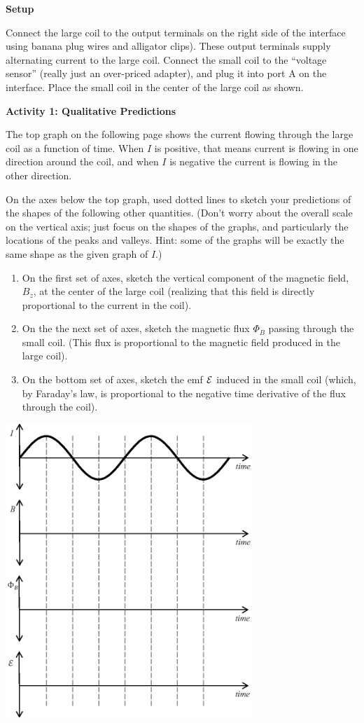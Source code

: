 \textbf{Setup}

Connect the large coil to the output
terminals on the right side of the interface using banana plug wires and 
alligator clips). These output terminals supply alternating current to the 
large coil. Connect the small coil to the ``voltage 
sensor'' (really just an over-priced adapter), and plug it into port A on the interface. Place the small coil in 
the center of the large coil as shown.
\bigskip

\textbf{Activity 1: Qualitative Predictions} 

The top graph on the 
following page shows the current flowing through the large 
coil as a function of time. When $I$ is positive, that means current is 
flowing in one direction around the coil, and when $I$ is negative the current 
is flowing in the other direction. 

On the axes below the top graph, used dotted lines to sketch your predictions of the 
shapes of the following other quantities.
(Don't worry about the overall scale on the vertical axis;
just focus on the shapes of the graphs, and particularly the locations
of the peaks and valleys.  Hint: some of the graphs will be exactly
the same shape as the given graph of $I$.)

\begin{enumerate}
\item
On the first set of axes, sketch the vertical component of the magnetic field,
$B_z$, at the center of the large coil (realizing that this field is directly
proportional to the current in the coil).
\item On the the next set of axes, sketch the magnetic flux $\Phi_ B$ passing
through the small coil. (This flux is proportional to the magnetic field 
produced in the large coil).
\item On the bottom set of axes, sketch the emf ${\cal E}$ induced in the small
coil (which, by Faraday's law, is proportional to the negative time derivative 
of the flux through the coil).
\end{enumerate}

\begin{center}
    \includegraphics[width=0.7\textwidth]{induction2/sine_curve.eps}
\end{center}

